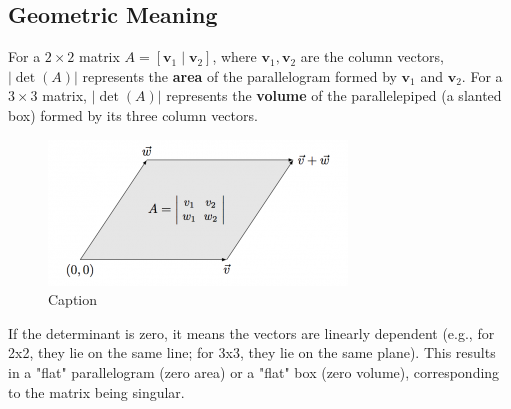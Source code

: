 \documentclass[11pt]{article}
\begin{document}
\subsection{Geometric Meaning}
For a $2 \times 2$ matrix $A = [\mathbf{v}_1 \mid \mathbf{v}_2]$, where $\mathbf{v}_1, \mathbf{v}_2$ are the column vectors, $|\det(A)|$ represents the \textbf{area} of the parallelogram formed by $\mathbf{v}_1$ and $\mathbf{v}_2$.
For a $3 \times 3$ matrix, $|\det(A)|$ represents the \textbf{volume} of the parallelepiped (a slanted box) formed by its three column vectors.

\begin{figure}[h]
    \centering
    \includegraphics[width=0.4\linewidth]{LA Lecture notes/figures/lec3_det.png}
    \caption{Caption}
\end{figure}

If the determinant is zero, it means the vectors are linearly dependent (e.g., for 2x2, they lie on the same line; for 3x3, they lie on the same plane). This results in a "flat" parallelogram (zero area) or a "flat" box (zero volume), corresponding to the matrix being singular.
\end{document}
